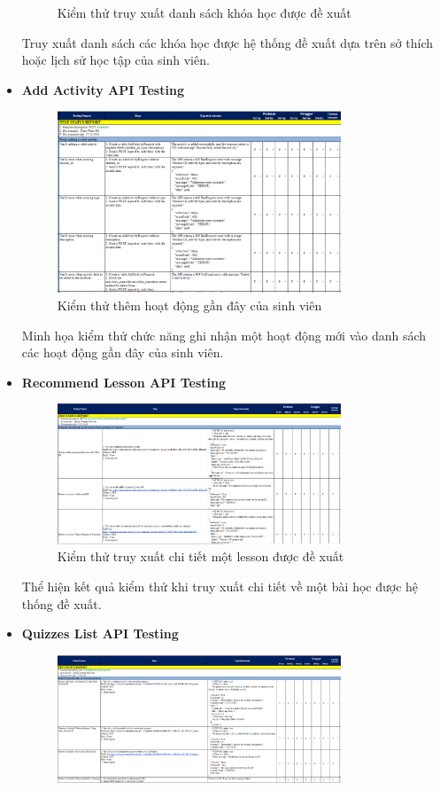\begin{itemize}
\begin{figure}[H]
        \caption{Kiểm thử truy xuất danh sách khóa học được đề xuất}
    \end{figure}
    Truy xuất danh sách các khóa học được hệ thống đề xuất dựa trên sở thích hoặc lịch sử học tập của sinh viên.
    \item \textbf{Add Activity API Testing}
    \begin{figure}[H]
        \centering
        \includegraphics[width=0.8\textwidth]{Images/test/test_AA.png}
        \caption{Kiểm thử thêm hoạt động gần đây của sinh viên}
    \end{figure}
    Minh họa kiểm thử chức năng ghi nhận một hoạt động mới vào danh sách các hoạt động gần đây của sinh viên.
    \item \textbf{Recommend Lesson API Testing}
    \begin{figure}[H]
        \centering
        \includegraphics[width=0.8\textwidth]{Images/test/test_RL.png}
        \caption{Kiểm thử truy xuất chi tiết một lesson được đề xuất}
    \end{figure}
    Thể hiện kết quả kiểm thử khi truy xuất chi tiết về một bài học được hệ thống đề xuất.
    \item \textbf{Quizzes List API Testing}
    \begin{figure}[H]
        \centering
        \includegraphics[width=0.8\textwidth]{Images/test/test_QL.png}

\end{figure}
\end{itemize}
